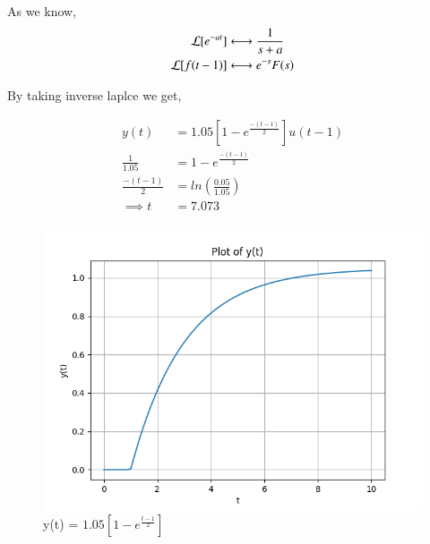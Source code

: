 \documentclass[journal,12pt,twocolumn]{IEEEtran}
\theoremstyle{remark}
\begin{document}
As we know,
\begin{align}
    \mathcal{L}[e^{-at}] &\system{} \frac{1}{s+a} \\
    \mathcal{L}[f(t-1)] &\system{} e^{-s}F(s)
\end{align}

By taking inverse laplce we get,

\begin{align}
    y(t) &= 1.05[1-e^{\frac{-(t-1)}{2}}]u(t-1) \\
    \frac{1}{1.05} &= 1-e^{\frac{-(t-1)}{2}} \\
    \frac{-(t-1)}{2} &= ln(\frac{0.05}{1.05}) \\
    \implies t &= 7.073 
\end{align}

\begin{figure}[h]
    \centering
    \includegraphics[width=\columnwidth]{figs/fig1.png}
    \caption{y(t) = $1.05[1-e^{\frac{t-1}{2}}]$}
    \label{fig:gate23ch62}
\end{figure}
\end{document}
